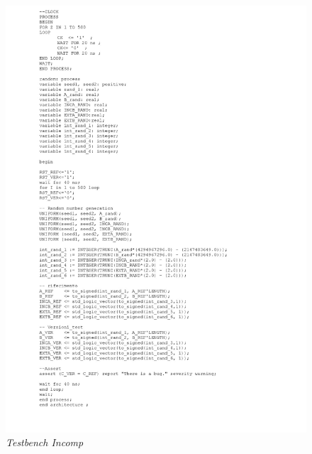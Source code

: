 \begin{figure}[!htb]
	\centering
	\includegraphics[scale=0.25]{immagini/testbench_vhdl2}
	\caption{\textit{Testbench Incomp}}
	\label{testbench_vhdl2}
\end{figure}
\newpage
